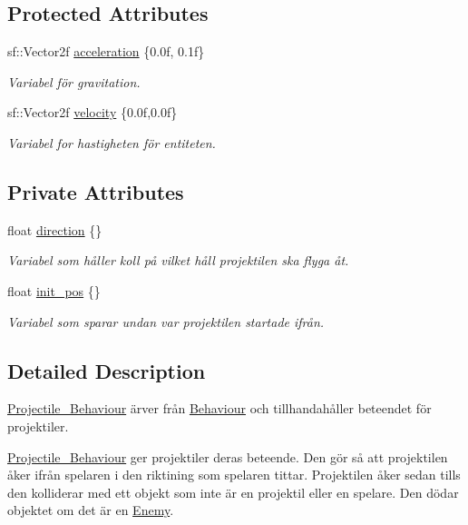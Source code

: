 \subsection*{Protected Attributes}
\begin{DoxyCompactItemize}
\item 
sf\+::\+Vector2f \hyperlink{classBehaviour_ac17cf81ceee6a44e8a8ec6ee810c9fd3}{acceleration} \{0.\+0f, 0.\+1f\}
\begin{DoxyCompactList}\small\item\em Variabel för gravitation. \end{DoxyCompactList}\item 
sf\+::\+Vector2f \hyperlink{classBehaviour_a1d52096cf20a59890f7705acbaccf88a}{velocity} \{0.\+0f,0.\+0f\}
\begin{DoxyCompactList}\small\item\em Variabel for hastigheten för entiteten. \end{DoxyCompactList}\end{DoxyCompactItemize}
\subsection*{Private Attributes}
\begin{DoxyCompactItemize}
\item 
float \hyperlink{classProjectile__Behaviour_a561a5badb72f1069375e4662baf8fd2d}{direction} \{\}
\begin{DoxyCompactList}\small\item\em Variabel som håller koll på vilket håll projektilen ska flyga åt. \end{DoxyCompactList}\item 
float \hyperlink{classProjectile__Behaviour_abf935a525d34c12810063c48a54d495e}{init\+\_\+pos} \{\}
\begin{DoxyCompactList}\small\item\em Variabel som sparar undan var projektilen startade ifrån. \end{DoxyCompactList}\end{DoxyCompactItemize}


\subsection{Detailed Description}
\hyperlink{classProjectile__Behaviour}{Projectile\+\_\+\+Behaviour} ärver från \hyperlink{classBehaviour}{Behaviour} och tillhandahåller beteendet för projektiler. 

\hyperlink{classProjectile__Behaviour}{Projectile\+\_\+\+Behaviour} ger projektiler deras beteende. Den gör så att projektilen åker ifrån spelaren i den riktining som spelaren tittar. Projektilen åker sedan tills den kolliderar med ett objekt som inte är en projektil eller en spelare. Den dödar objektet om det är en \hyperlink{classEnemy}{Enemy}. 

